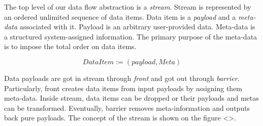 
\label {fs-data-flow}

The top level of our data flow abstraction is a {\it stream}. Stream is represented by an ordered unlimited sequence of data items. Data item is a {\it payload} and a {\it meta-data} associated with it. Payload is an arbitrary user-provided data. Meta-data is a structured system-assigned information. The primary purpose of the meta-data is to impose the total order on data items. 

\[DataItem := (payload, Meta)\]

Data payloads are got in stream through {\it front} and got out through {\it barrier}. Particularly, front creates data items from input payloads by assigning them meta-data. Inside stream, data items can be dropped or their payloads and metas can be transformed. Eventually, barrier removes meta-information and outputs back pure payloads. The concept of the stream is shown on the figure <>.
